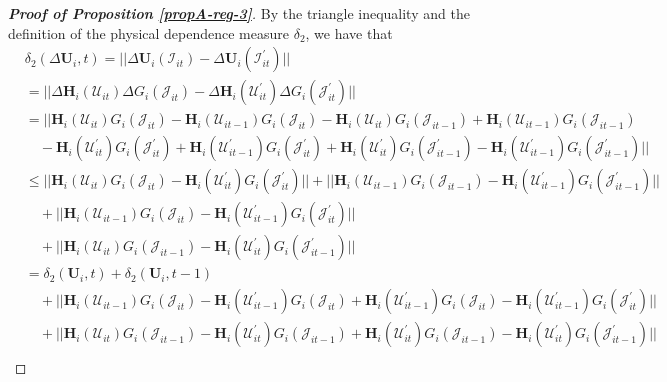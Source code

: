 \begin{proof}[\textnormal{\textbf{Proof of Proposition \ref{propA-reg-3}}}]
By the triangle inequality and the definition of the physical dependence measure $\delta_2$, we have that
\begin{align*}
 &\delta_2(\Delta \mathbf{U}_i, t) = || \Delta\mathbf{U}_i(\mathcal{I}_{it}) - \Delta \mathbf{U}_i(\mathcal{I}_{it}^\prime) || \\
 &= || \Delta \mathbf{H}_i(\mathcal{U}_{it}) \Delta G_i(\mathcal{J}_{it}) -  \Delta \mathbf{H}_i(\mathcal{U}_{it}^\prime) \Delta G_i(\mathcal{J}_{it}^\prime) ||\\
  &= ||\mathbf{H}_i(\mathcal{U}_{it})G_i(\mathcal{J}_{it}) - \mathbf{H}_i(\mathcal{U}_{it-1})G_i(\mathcal{J}_{it}) - \mathbf{H}_i(\mathcal{U}_{it})G_i(\mathcal{J}_{it-1})  + \mathbf{H}_i(\mathcal{U}_{it-1})G_i(\mathcal{J}_{it-1})  \\
 &\quad - \mathbf{H}_i(\mathcal{U}_{it}^\prime)G_i(\mathcal{J}_{it}^\prime) + \mathbf{H}_i(\mathcal{U}_{it-1}^\prime)G_i(\mathcal{J}_{it}^\prime) + \mathbf{H}_i(\mathcal{U}_{it}^\prime)G_i(\mathcal{J}_{it-1}^\prime)  - \mathbf{H}_i(\mathcal{U}_{it-1}^\prime)G_i(\mathcal{J}_{it-1}^\prime) || \\
 &\leq ||\mathbf{H}_i(\mathcal{U}_{it})G_i(\mathcal{J}_{it}) - \mathbf{H}_i(\mathcal{U}_{it}^\prime)G_i(\mathcal{J}_{it}^\prime) || + ||\mathbf{H}_i(\mathcal{U}_{it-1})G_i(\mathcal{J}_{it-1}) -  \mathbf{H}_i(\mathcal{U}_{it-1}^\prime)G_i(\mathcal{J}_{it-1}^\prime)||  \\
 &\quad + ||\mathbf{H}_i(\mathcal{U}_{it-1})G_i(\mathcal{J}_{it}) -\mathbf{H}_i(\mathcal{U}_{it-1}^\prime)G_i(\mathcal{J}_{it}^\prime)    || \\
 &\quad + ||\mathbf{H}_i(\mathcal{U}_{it})G_i(\mathcal{J}_{it-1}) -  \mathbf{H}_i(\mathcal{U}_{it}^\prime)G_i(\mathcal{J}_{it-1}^\prime) ||  \\
 & = \delta_2(\mathbf{U}_i, t) + \delta_2(\mathbf{U}_i, t-1)  \\
 &\quad + ||\mathbf{H}_i(\mathcal{U}_{it-1})G_i(\mathcal{J}_{it}) - \mathbf{H}_i(\mathcal{U}_{it-1}^\prime)G_i(\mathcal{J}_{it}) + \mathbf{H}_i(\mathcal{U}_{it-1}^\prime)G_i(\mathcal{J}_{it}) - \mathbf{H}_i(\mathcal{U}_{it-1}^\prime)G_i(\mathcal{J}_{it}^\prime)    ||\\
 &\quad + ||\mathbf{H}_i(\mathcal{U}_{it})G_i(\mathcal{J}_{it-1}) -\mathbf{H}_i(\mathcal{U}_{it}^\prime)G_i(\mathcal{J}_{it-1})+ \mathbf{H}_i(\mathcal{U}_{it}^\prime)G_i(\mathcal{J}_{it-1})-  \mathbf{H}_i(\mathcal{U}_{it}^\prime)G_i(\mathcal{J}_{it-1}^\prime) || \\

\end{align*}
\end{proof}

